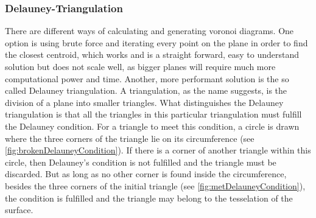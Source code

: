 \subsubsection{Delauney-Triangulation}

There are different ways of calculating and generating voronoi diagrams. One option is using brute force and iterating every point on the plane in order to find the closest centroid, which works and is a straight forward, easy to understand solution but does not scale well, as bigger planes will require much more computational power and time. Another, more performant solution is the so called Delauney triangulation. 
A triangulation, as the name suggests, is the division of a plane into smaller triangles. What distinguishes the Delauney triangulation is that all the triangles in this particular triangulation must fulfill the Delauney condition. For a triangle to meet this condition, a circle is drawn where the three corners of the triangle lie on its circumference (see \ref{fig:brokenDelauneyCondition}). If there is a corner of another triangle within this circle, then Delauney's condition is not fulfilled and the triangle must be discarded. But as long as no other corner is found inside the circumference, besides the three corners of the initial triangle (see \ref{fig:metDelauneyCondition}), the condition is fulfilled and the triangle may belong to the tesselation of the surface.

